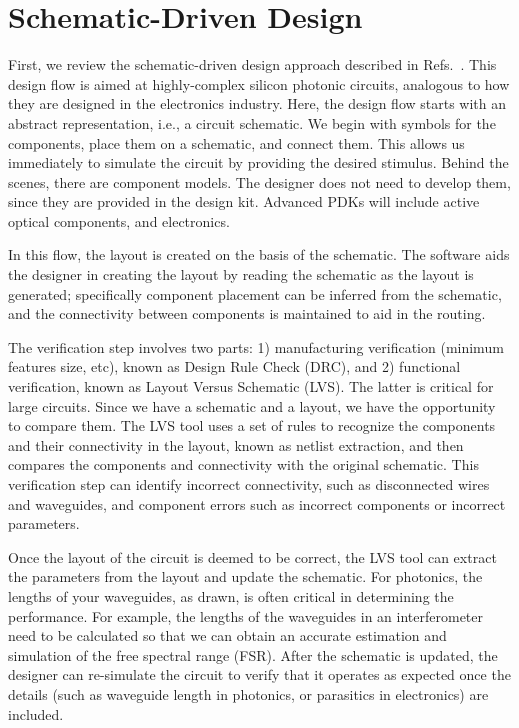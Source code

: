 \documentclass[journal]{spie}
\begin{document}
\section{Schematic-Driven Design}

First, we review the schematic-driven design approach described in Refs.~.   This design flow is aimed at highly-complex silicon photonic circuits, analogous to how they are designed in the electronics industry.  Here, the design flow starts with an abstract representation, i.e., a circuit schematic.  We begin with symbols for the components,  place them on a schematic, and connect them.   This allows us immediately to simulate the circuit by providing the desired stimulus.  Behind the scenes, there are component models.  The designer does not need to develop them, since they are provided in the design kit.  Advanced PDKs will include active optical components, and electronics.  

In this flow, the layout is created on the basis of the schematic.  The software aids the designer in creating the layout by reading the schematic as the layout is generated; specifically component placement can be inferred from the schematic, and the connectivity between components is maintained to aid in the routing.

The verification step involves two parts: 1) manufacturing verification (minimum features size, etc), known as Design Rule Check (DRC), and 2) functional verification, known as Layout Versus Schematic  (LVS).  The latter is critical for large circuits.  Since we have a schematic and a layout, we have the opportunity to compare them.  The LVS tool uses a set of rules to recognize the components and their connectivity in the layout, known as netlist extraction, and then compares the components and connectivity with the original schematic.  This verification step can identify incorrect connectivity, such as disconnected wires and waveguides, and component errors such as incorrect components or incorrect parameters.

Once the layout of the circuit is deemed to be correct, the LVS tool can extract the parameters from the layout and update the schematic.  For photonics, the lengths of your waveguides, as drawn, is often critical in determining the performance.  For example, the lengths of the waveguides in an interferometer need to be calculated so that we can obtain an accurate estimation and simulation of the free spectral range (FSR). After the schematic is updated, the designer can re-simulate the circuit to verify that it operates as expected once the details (such as waveguide length in photonics, or parasitics in electronics) are included.
\end{document}
